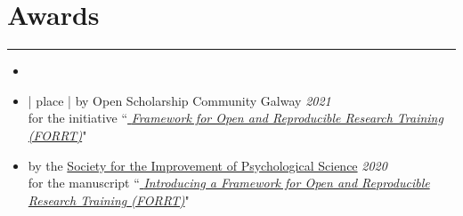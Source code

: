 \documentclass[letterpaper]{article}
\begin{document}
\section*{\color{Brown} Awards}
\vspace{-0.5em}
\hrule
\vspace{1em}
\begin{itemize}

\item[]{} 


\item[]{ |  place | by Open Scholarship Community Galway  \hfill{\em 2021} \\ for the initiative ``{\href{http://forrt.org/}{\color{BlueViolet} \it Framework for Open and Reproducible Research Training (FORRT)}}" \hfill{\em{}}
}

\item[]{ by the \href{http://improvingpsych.org/mission/awards/}{\color{BlueViolet}Society for the Improvement of Psychological Science} \hfill{\em 2020} \\ for the manuscript ``{\href{https://osf.io/bnh7p}{\color{BlueViolet} \it Introducing a Framework for Open and Reproducible Research Training (FORRT)}}"}

\end{itemize}



\\~\\
\end{document}

